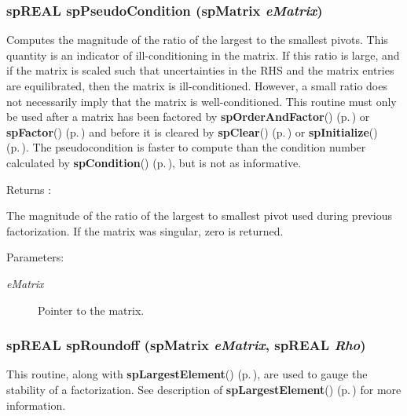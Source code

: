 \subsubsection{\setlength{\rightskip}{0pt plus 5cm}sp\-REAL sp\-Pseudo\-Condition ({\bf sp\-Matrix} {\em e\-Matrix})}\label{spUtils_8c_a19}


Computes the magnitude of the ratio of the largest to the smallest pivots. This quantity is an indicator of ill-conditioning in the matrix. If this ratio is large, and if the matrix is scaled such that uncertainties in the RHS and the matrix entries are equilibrated, then the matrix is ill-conditioned. However, a small ratio does not necessarily imply that the matrix is well-conditioned. This routine must only be used after a matrix has been factored by {\bf sp\-Order\-And\-Factor}() {\rm (p.\,\pageref{spFactor_8c_a24})} or {\bf sp\-Factor}() {\rm (p.\,\pageref{spFactor_8c_a25})} and before it is cleared by {\bf sp\-Clear}() {\rm (p.\,\pageref{spBuild_8c_a10})} or {\bf sp\-Initialize}() {\rm (p.\,\pageref{spBuild_8c_a21})}. The pseudocondition is faster to compute than the condition number calculated by {\bf sp\-Condition}() {\rm (p.\,\pageref{spUtils_8c_a20})}, but is not as informative.

\begin{Desc}
\item[Returns :]\par
 The magnitude of the ratio of the largest to smallest pivot used during previous factorization. If the matrix was singular, zero is returned.\end{Desc}
\begin{Desc}
\item[Parameters: ]\par
\begin{description}
\item[{\em 
e\-Matrix}]Pointer to the matrix. \end{description}
\end{Desc}
\subsubsection{\setlength{\rightskip}{0pt plus 5cm}sp\-REAL sp\-Roundoff ({\bf sp\-Matrix} {\em e\-Matrix}, sp\-REAL {\em Rho})}\label{spUtils_8c_a23}


This routine, along with {\bf sp\-Largest\-Element}() {\rm (p.\,\pageref{spUtils_8c_a22})}, are used to gauge the stability of a factorization. See description of {\bf sp\-Largest\-Element}() {\rm (p.\,\pageref{spUtils_8c_a22})} for more information.

